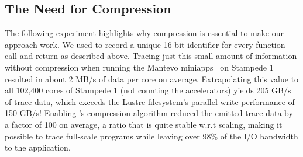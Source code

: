 \subsection{The Need for Compression}

The following experiment highlights why compression is essential to make our approach work. We used \parlot to record a unique 16-bit identifier for every function call and return as described above. Tracing just this small amount of information without compression when running the Mantevo miniapps~\cite{mantevo} on Stampede 1 resulted in about 2 MB/s of data per core on average. Extrapolating this value to all 102,400 cores of Stampede 1 (not counting the accelerators) yields 205 GB/s of trace data, which exceeds the Lustre filesystem's parallel write performance of 150 GB/s! 
%
Enabling \parlot 's compression algorithm reduced the emitted trace data by a factor of 100 on average, a ratio that is quite stable w.r.t scaling, making it possible to trace full-scale programs while leaving over 98\% of the I/O bandwidth to the application.
